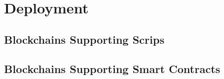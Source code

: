 \section{Deployment}

\subsection{Blockchains Supporting Scrips}

\subsection{Blockchains Supporting Smart Contracts}